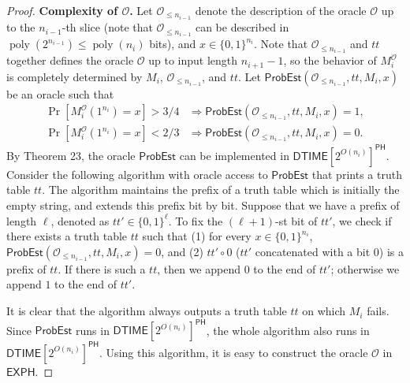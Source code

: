 \begin{proof}
\textbf{Complexity of $\mathcal O$.} Let $\mathcal O_{\leq n_{i-1}}$ denote the description of the oracle $\mathcal O$ up to the $n_{i-1}$-th slice (note that $\mathcal O_{\leq n_{i-1}}$ can be described in $\operatorname{poly}(2^{n_{i-1}})\leq\operatorname{poly}(n_i)$ bits), and $x\in\{0,1\}^{n_i}$. Note that $\mathcal O_{\leq n_{i-1}}$ and $tt$ together defines the oracle $\mathcal O$ up to input length $n_{i+1}-1$, so the behavior of $M_i^{\mathcal O}$ is completely determined by $M_i$, $\mathcal O_{\leq n_{i-1}}$, and $tt$. Let $\mathsf{ProbEst}(\mathcal O_{\leq n_{i-1}},tt,M_i,x)$ be an oracle such that
\begin{align*}
\Pr[M_i^{\mathcal O}(1^{n_i})=x]>3/4&\Longrightarrow\mathsf{ProbEst}(\mathcal O_{\leq n_{i-1}},tt,M_i,x)=1,\\
\Pr[M_i^{\mathcal O}(1^{n_i})=x]<2/3&\Longrightarrow\mathsf{ProbEst}(\mathcal O_{\leq n_{i-1}},tt,M_i,x)=0.
\end{align*}
By Theorem 23, the oracle $\mathsf{ProbEst}$ can be implemented in $\mathsf{DTIME}[2^{O(n_i)}]^{\mathsf{PH}}$. Consider the following algorithm with oracle access to $\mathsf{ProbEst}$ that prints a truth table $tt$. The algorithm maintains the prefix of a truth table which is initially the empty string, and extends this prefix bit by bit. Suppose that we have a prefix of length $\ell$, denoted as $tt'\in\{0,1\}^{\ell}$. To fix the $(\ell+1)$-st bit of $tt'$, we check if there exists a truth table $tt$ such that (1) for every $x\in\{0,1\}^{n_i}$, $\mathsf{ProbEst}(\mathcal O_{\leq n_{i-1}},tt,M_i,x)=0$, and (2) $tt'\circ0$ ($tt'$ concatenated with a bit $0$) is a prefix of $tt$. If there is such a $tt$, then we append $0$ to the end of $tt'$; otherwise we append $1$ to the end of $tt'$.

It is clear that the algorithm always outputs a truth table $tt$ on which $M_i$ fails. Since $\mathsf{ProbEst}$ runs in $\mathsf{DTIME}[2^{O(n_i)}]^{\mathsf{PH}}$, the whole algorithm also runs in $\mathsf{DTIME}[2^{O(n_i)}]^{\mathsf{PH}}$. Using this algorithm, it is easy to construct the oracle $\mathcal O$ in $\mathsf{EXPH}$.
\end{proof}
